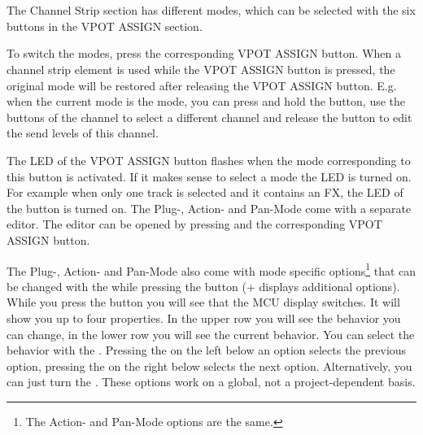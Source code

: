 \section{\csms}\label{csmodes}

The Channel Strip section has different modes, which can be
selected with the six buttons in the VPOT ASSIGN section.

To switch the modes, press the corresponding VPOT ASSIGN button. When
a channel strip element is used while the VPOT ASSIGN button is
pressed, the original mode will be restored after releasing the VPOT
ASSIGN button. E.g. when the current mode is the \send mode, you can
press and hold the \pan button, use the \select buttons of the channel
to select a different channel and release the \pan button to edit the
send levels of this channel.

The LED of the VPOT ASSIGN button flashes when the mode corresponding
to this button is activated. If it makes sense to select a mode the LED
is turned on. For example when only one track is selected and it contains an
FX, the LED of the \plug button is turned on. The Plug-, Action- and
Pan-Mode come with a separate editor. The editor can be opened by pressing
\alt and the corresponding VPOT ASSIGN button.

The Plug-, Action- and Pan-Mode also come with mode specific
options\footnote{The Action- and Pan-Mode options are the same.} that
can be changed with the \vpots while pressing the \option button
(\shift + \option displays additional options).  While you press the
\option button you will see that the MCU display switches. It will
show you up to four properties. In the upper row you will see the
behavior you can change, in the lower row you will see the current
behavior. You can select the behavior with the \vpots. Pressing the
\vpot on the left below an option selects the previous option,
pressing the \vpot on the right below selects the next
option. Alternatively, you can just turn the \vpots. These options
work on a global, not a project-dependent basis.


